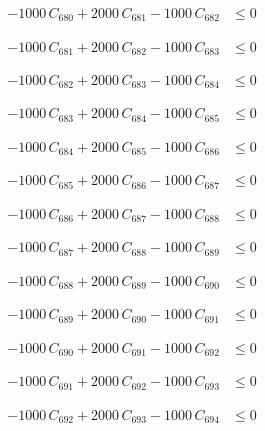 \documentclass[a4paper,11pt]{article}
\begin{document}
\begin{align}
-1000\,C_{680} + 2000\,C_{681} - 1000\,C_{682} &\leq 0 \nonumber
\end{align}

\begin{align}
-1000\,C_{681} + 2000\,C_{682} - 1000\,C_{683} &\leq 0 \nonumber
\end{align}

\begin{align}
-1000\,C_{682} + 2000\,C_{683} - 1000\,C_{684} &\leq 0 \nonumber
\end{align}

\begin{align}
-1000\,C_{683} + 2000\,C_{684} - 1000\,C_{685} &\leq 0 \nonumber
\end{align}

\begin{align}
-1000\,C_{684} + 2000\,C_{685} - 1000\,C_{686} &\leq 0 \nonumber
\end{align}

\begin{align}
-1000\,C_{685} + 2000\,C_{686} - 1000\,C_{687} &\leq 0 \nonumber
\end{align}

\begin{align}
-1000\,C_{686} + 2000\,C_{687} - 1000\,C_{688} &\leq 0 \nonumber
\end{align}

\begin{align}
-1000\,C_{687} + 2000\,C_{688} - 1000\,C_{689} &\leq 0 \nonumber
\end{align}

\begin{align}
-1000\,C_{688} + 2000\,C_{689} - 1000\,C_{690} &\leq 0 \nonumber
\end{align}

\begin{align}
-1000\,C_{689} + 2000\,C_{690} - 1000\,C_{691} &\leq 0 \nonumber
\end{align}

\begin{align}
-1000\,C_{690} + 2000\,C_{691} - 1000\,C_{692} &\leq 0 \nonumber
\end{align}

\begin{align}
-1000\,C_{691} + 2000\,C_{692} - 1000\,C_{693} &\leq 0 \nonumber
\end{align}

\begin{align}
-1000\,C_{692} + 2000\,C_{693} - 1000\,C_{694} &\leq 0 \nonumber
\end{align}
\end{document}
